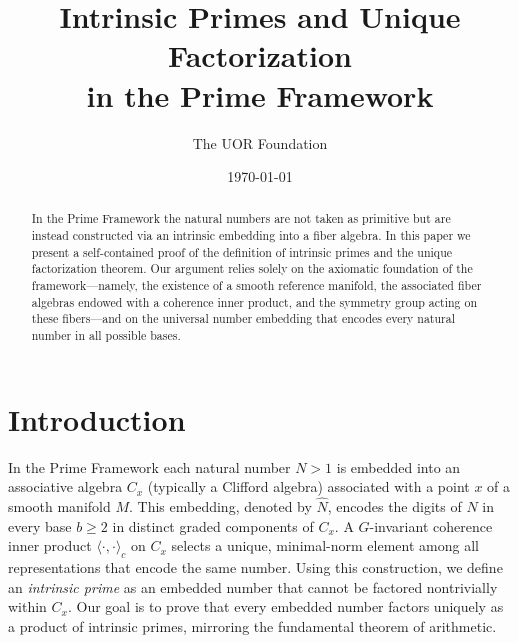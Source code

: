 \documentclass{article}
\begin{document}
\title{Intrinsic Primes and Unique Factorization\\ in the Prime Framework}
\author{The UOR Foundation}
\date{\today}
\maketitle

\begin{abstract}
  In the Prime Framework the natural numbers are not taken as primitive but are instead constructed via an intrinsic embedding into a fiber algebra. In this paper we present a self-contained proof of the definition of intrinsic primes and the unique factorization theorem. Our argument relies solely on the axiomatic foundation of the framework---namely, the existence of a smooth reference manifold, the associated fiber algebras endowed with a coherence inner product, and the symmetry group acting on these fibers---and on the universal number embedding that encodes every natural number in all possible bases.
\end{abstract}

\section{Introduction}
In the Prime Framework each natural number \(N>1\) is embedded into an associative algebra \(C_x\) (typically a Clifford algebra) associated with a point \(x\) of a smooth manifold \(M\). This embedding, denoted by \(\widehat{N}\), encodes the digits of \(N\) in every base \(b\ge2\) in distinct graded components of \(C_x\). A \(G\)-invariant coherence inner product \(\langle \cdot,\cdot \rangle_c\) on \(C_x\) selects a unique, minimal-norm element among all representations that encode the same number. Using this construction, we define an \emph{intrinsic prime} as an embedded number that cannot be factored nontrivially within \(C_x\). Our goal is to prove that every embedded number factors uniquely as a product of intrinsic primes, mirroring the fundamental theorem of arithmetic.
\end{document}
